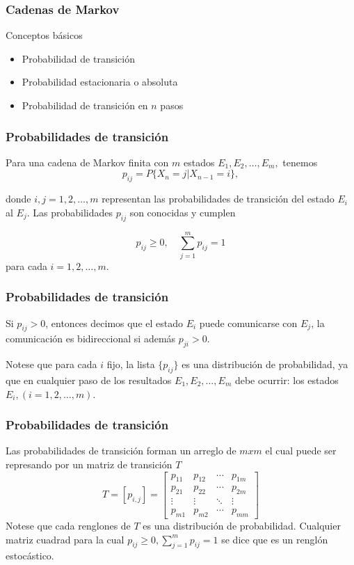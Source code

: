 \documentclass[spanish]{beamer}
\begin{document}
\begin{frame}
\frametitle{Cadenas de Markov}
Conceptos básicos
\begin{itemize}
\item Probabilidad de transición 
\item Probabilidad estacionaria o absoluta
\item Probabilidad de transición en $n$ pasos
\end{itemize}
\end{frame}


\begin{frame}
\frametitle{Probabilidades de transición}
Para una cadena de Markov finita con $m$ estados $E_{1}, E_{2} ,\ldots, E_{m},$  tenemos 
\begin{equation*}
p_{ij} = P\lbrace X_{n} = j \vert X_{n-1} = i\rbrace,
\end{equation*}

donde $i, j = 1, 2, \ldots, m$  representan las probabilidades de transición del estado $E_{i}$ al $E_{j} $. Las probabilidades $p_{ij}$ son conocidas y cumplen 

\begin{equation*}
p_{ij} \geq 0, \quad \sum_{j=1}^{m}{p_{ij}}=1
\end{equation*}
para cada $i = 1, 2, \ldots, m$. 
\end{frame}
\begin{frame}
\frametitle{Probabilidades de transición}
Si $p_{ij}> 0$, entonces decimos que el estado $E_{i}$ puede comunicarse con $E_{j}$, la comunicación es bidireccional si además $p_{ji}> 0$. 

Notese que para cada $i$ fijo, la lista $\lbrace p_{ij}\rbrace$ es una distribución de probabilidad, ya que en cualquier paso de los resultados $E_{1}, E_{2}, \ldots, E_{m}$ debe ocurrir: los estados $E_{i}, (i = 1, 2, \ldots, m)$.
\end{frame}
\begin{frame}
\frametitle{Probabilidades de transición}
Las probabilidades de transición forman un arreglo  de $mxm$ el cual puede ser represando por un matriz de transición $T$
\begin{equation}
T =[p_{i,j}]=\begin{bmatrix}
p_{11} & p_{12} & \cdots & p_{1m} \\
p_{21} & p_{22} & \cdots & p_{2m} \\
\vdots & \vdots & \ddots & \vdots \\
p_{m1} & p_{m2} & \cdots & p_{mm} 
\end{bmatrix}
\end{equation} 
Notese que cada renglones de $T$ es una distribución de probabilidad. Cualquier matriz cuadrad para la cual $p_{ij} \geq 0, \sum_{j=1}^{m}{p_{ij}}=1$ se dice que es un renglón estocástico.
\end{frame}
\end{document}
